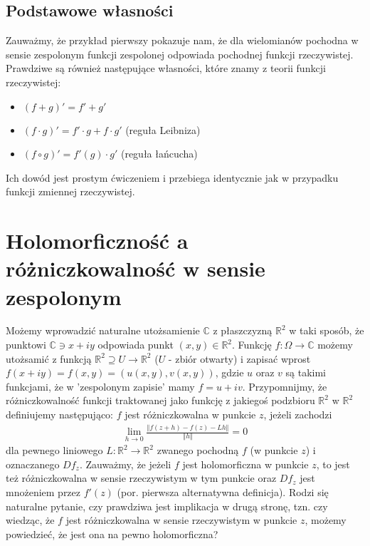 \subsection{Podstawowe własności}
Zauważmy, że przykład pierwszy pokazuje nam, że dla wielomianów pochodna w sensie zespolonym funkcji zespolonej odpowiada pochodnej funkcji rzeczywistej. Prawdziwe są również następujące własności, które znamy z teorii funkcji rzeczywistej:
\begin{itemize}
	\item $(f+g)' = f' + g'$
	\item $(f \cdot g)' = f' \cdot g + f \cdot g'$ (reguła Leibniza)
	\item $(f \circ g)' = f'(g) \cdot g'$ (reguła łańcucha)
\end{itemize}
Ich dowód jest prostym ćwiczeniem i przebiega identycznie jak w przypadku funkcji zmiennej rzeczywistej.

\section{Holomorficzność a różniczkowalność w sensie zespolonym}
Możemy wprowadzić naturalne utożsamienie $\mathbb{C}$ z płaszczyzną $\mathbb{R}^2$ w taki sposób, że punktowi $\mathbb{C} \ni x+iy$ odpowiada punkt $(x,y) \in \mathbb{R}^2$. Funkcję $f : \Omega \to \mathbb{C}$ możemy utożsamić z funkcją $\mathbb{R}^2 \supseteq U \to \mathbb{R}^2$ ($U$ - zbiór otwarty) i zapisać wprost $f(x+iy) = f(x,y) = (u(x,y),v(x,y))$, gdzie $u$ oraz $v$ są takimi funkcjami, że w 'zespolonym zapisie' mamy $f = u+iv$.
Przypomnijmy, że różniczkowalność funkcji traktowanej jako funkcję z jakiegoś podzbioru $\mathbb{R}^2$ w $\mathbb{R}^2$ definiujemy następująco: $f$ jest różniczkowalna w punkcie $z$, jeżeli zachodzi
\begin{align*}
	\lim_{h\to 0} \frac{\Vert f(z+h)-f(z)-L h \Vert}{\Vert h \Vert} = 0
\end{align*}
dla pewnego liniowego $L : \mathbb{R}^2 \to \mathbb{R}^2$ zwanego pochodną $f$ (w punkcie $z$) i oznaczanego $Df_z$.
Zauważmy, że jeżeli $f$ jest holomorficzna w punkcie $z$, to jest też różniczkowalna w sensie rzeczywistym w tym punkcie oraz $Df_z$ jest mnożeniem przez $f'(z)$ (por. pierwsza alternatywna definicja). Rodzi się naturalne pytanie, czy prawdziwa jest implikacja w drugą stronę, tzn. czy wiedząc, że $f$ jest różniczkowalna w sensie rzeczywistym w punkcie $z$, możemy powiedzieć, że jest ona na pewno holomorficzna?

